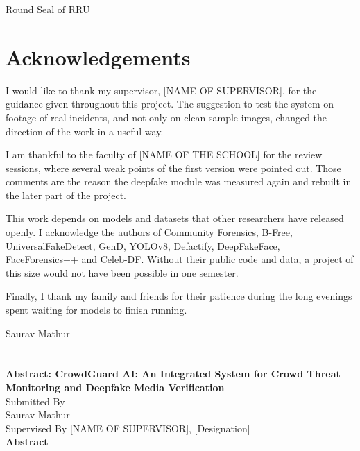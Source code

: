 \documentclass[12pt,a4paper,oneside]{report}
\newcommand{\supervisor}{[NAME OF SUPERVISOR]}
\newcommand{\supdesignation}{[Designation]}
\newcommand{\schoolname}{[NAME OF THE SCHOOL]}
\begin{document}
\vspace{1.5cm}
\begin{center}Round Seal of RRU\end{center}

\chapter*{\centering Acknowledgements}
I would like to thank my supervisor, \supervisor, for the guidance given throughout this project. The suggestion to test the system on footage of real incidents, and not only on clean sample images, changed the direction of the work in a useful way.

I am thankful to the faculty of \schoolname{} for the review sessions, where several weak points of the first version were pointed out. Those comments are the reason the deepfake module was measured again and rebuilt in the later part of the project.

This work depends on models and datasets that other researchers have released openly. I acknowledge the authors of Community Forensics, B-Free, UniversalFakeDetect, GenD, YOLOv8, Defactify, DeepFakeFace, FaceForensics++ and Celeb-DF. Without their public code and data, a project of this size would not have been possible in one semester.

Finally, I thank my family and friends for their patience during the long evenings spent waiting for models to finish running.

\vspace{1cm}
\hfill Saurav Mathur

\tableofcontents
\listoffigures
{}
\listoftables
{}

\chapter*{}
\vspace{-2.5cm}
\begin{center}
\textbf{Abstract: CrowdGuard AI: An Integrated System for Crowd Threat Monitoring and Deepfake Media Verification}\\[6pt]
Submitted By\\ Saurav Mathur\\[4pt]
Supervised By \supervisor, \supdesignation\\[10pt]
\textbf{Abstract}
\end{center}
\end{document}

